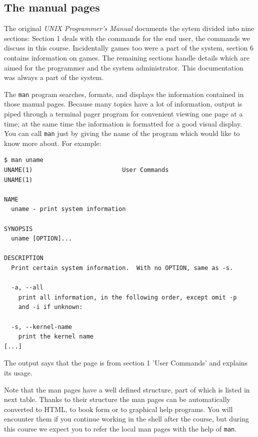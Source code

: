 \documentclass[11pt,a4paper,twoside]{article}
\begin{document}
\subsection{The manual pages}
The original \emph{UNIX Programmer's Manual} documents the sytem divided 
into nine sections: Section 1 deals with the commands for the end user,
the commands we discuss in this course. Incidentally games too were a 
part of the system, section 6 contains information on games.  The remaining
sections handle details which are aimed for the programmer and the system 
administrator.  This documentation was always a part of the system.

The \texttt{man} program searches, formats, and displays the information
contained in those manual pages. Because many topics have a lot of information, 
output is piped through a terminal pager program for convenient viewing
one page at a time; at the same time the information is formatted for a good 
visual display. You can call \texttt{man} just by giving the name of the 
program which would like to know more about. For example:

\begin{lstlisting}[frame=single]
$ man uname
UNAME(1)                         User Commands                        UNAME(1)

NAME
  uname - print system information

SYNOPSIS
  uname [OPTION]...

DESCRIPTION
  Print certain system information.  With no OPTION, same as -s.

  -a, --all
    print all information, in the following order, except omit -p
    and -i if unknown:

  -s, --kernel-name
    print the kernel name
[...]
\end{lstlisting}

The output says that the page is from section 1 'User Commands' and
explains its usage. 

Note that the man pages have a well defined structure, part of which is 
listed in next table. Thanks to their structure the man pages can be 
automatically converted to HTML, to book form or to graphical help programs.
You will encounter them if you continue working in the shell after the 
course, but during this course we expect you to refer the local man pages 
with the help of \texttt{man}.
\end{document}
